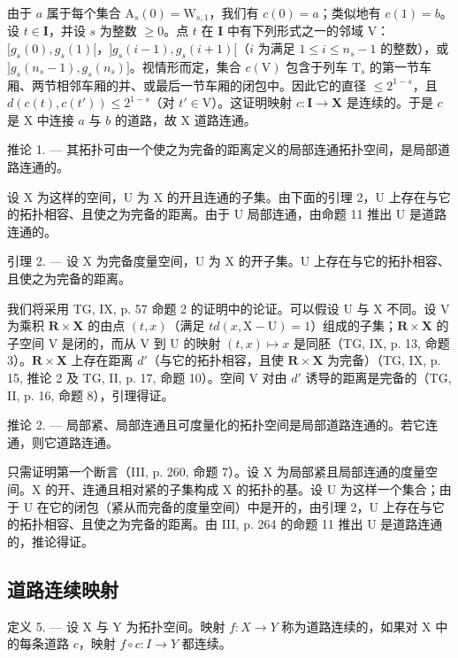 由于 \(a\) 属于每个集合 \(\mathrm{A}_s(0) = \mathrm{W}_{s,1}\)，我们有 \(c(0) = a\)；类似地有 \(c(1) = b\)。设 \(t \in \mathbf{I}\)，并设 \(s\) 为整数 \(\geqslant 0\)。点 \(t\) 在 \(\mathbf{I}\) 中有下列形式之一的邻域 V：\([g_s(0), g_s(1)[\)，\(]g_s(i - 1), g_s(i + 1)[\)（\(i\) 为满足 \(1 \leqslant i \leqslant n_s - 1\) 的整数），或 \(]g_s(n_s - 1), g_s(n_s)]\)。视情形而定，集合 \(c(\mathrm{V})\) 包含于列车 \(\mathrm{T}_s\) 的第一节车厢、两节相邻车厢的并、或最后一节车厢的闭包中。因此它的直径 \(\leqslant 2^{1-s}\)，且 \(d(c(t), c(t')) \leqslant 2^{1-s}\)（对 \(t' \in \mathrm{V}\)）。这证明映射 \(c\colon \mathbf{I} \to \mathbf{X}\) 是连续的。于是 \(c\) 是 X 中连接 \(a\) 与 \(b\) 的道路，故 X 道路连通。

推论 1. --- 其拓扑可由一个使之为完备的距离定义的局部连通拓扑空间，是局部道路连通的。

设 X 为这样的空间，U 为 X 的开且连通的子集。由下面的引理 2，U 上存在与它的拓扑相容、且使之为完备的距离。由于 U 局部连通，由命题 11 推出 U 是道路连通的。

引理 2. --- 设 X 为完备度量空间，U 为 X 的开子集。U 上存在与它的拓扑相容、且使之为完备的距离。

我们将采用 TG, IX, p. 57 命题 2 的证明中的论证。可以假设 U 与 X 不同。设 V 为乘积 \(\mathbf{R} \times \mathbf{X}\) 的由点 \((t,x)\)（满足 \(td(x,\mathrm{X}-\mathrm{U})=1\)）组成的子集；\(\mathbf{R} \times \mathbf{X}\) 的子空间 V 是闭的，而从 V 到 U 的映射 \((t,x) \mapsto x\) 是同胚（TG, IX, p. 13, 命题 3）。\(\mathbf{R} \times \mathbf{X}\) 上存在距离 \(d'\)（与它的拓扑相容，且使 \(\mathbf{R} \times \mathbf{X}\) 为完备）（TG, IX, p. 15, 推论 2 及 TG, II, p. 17, 命题 10）。空间 V 对由 \(d'\) 诱导的距离是完备的（TG, II, p. 16, 命题 8），引理得证。

推论 2. --- 局部紧、局部连通且可度量化的拓扑空间是局部道路连通的。若它连通，则它道路连通。

只需证明第一个断言（III, p. 260, 命题 7）。设 X 为局部紧且局部连通的度量空间。X 的开、连通且相对紧的子集构成 X 的拓扑的基。设 U 为这样一个集合；由于 U 在它的闭包（紧从而完备的度量空间）中是开的，由引理 2，U 上存在与它的拓扑相容、且使之为完备的距离。由 III, p. 264 的命题 11 推出 U 是道路连通的，推论得证。

\subsection{道路连续映射}

定义 5. --- 设 X 与 Y 为拓扑空间。映射 \(f: X \to Y\) 称为道路连续的，如果对 X 中的每条道路 \(c\)，映射 \(f \circ c: I \to Y\) 都连续。

